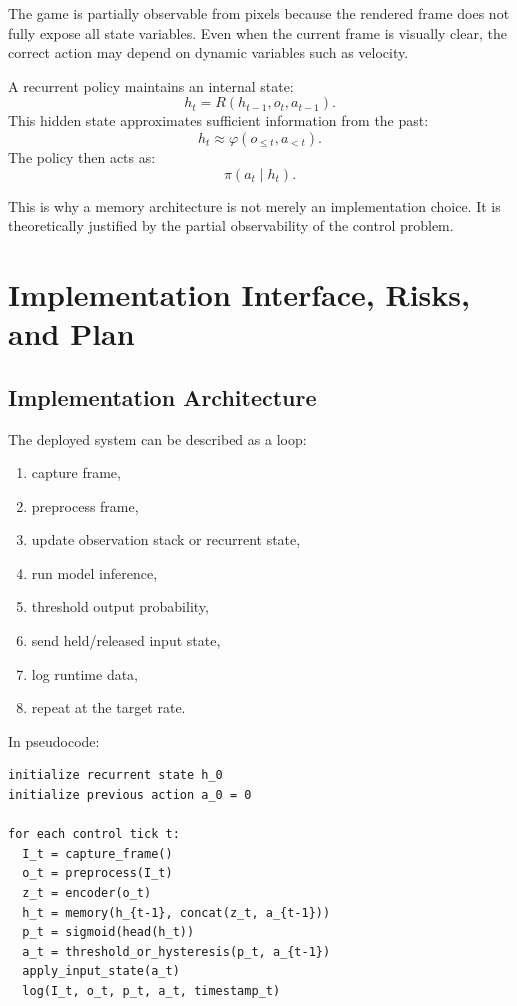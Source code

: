 \documentclass[11pt]{article}
\begin{document}
The game is partially observable from pixels because the rendered frame does not fully expose all state variables. Even when the current frame is visually clear, the correct action may depend on dynamic variables such as velocity.

A recurrent policy maintains an internal state:
\[
  h_t = R(h_{t-1},o_t,a_{t-1}).
\]
This hidden state approximates sufficient information from the past:
\[
  h_t \approx \varphi(o_{\le t},a_{<t}).
\]
The policy then acts as:
\[
  \pi(a_t \mid h_t).
\]

This is why a memory architecture is not merely an implementation choice. It is theoretically justified by the partial observability of the control problem.

\section{Implementation Interface, Risks, and Plan}

\subsection{Implementation Architecture}

The deployed system can be described as a loop:
\begin{enumerate}
  \item capture frame,
  \item preprocess frame,
  \item update observation stack or recurrent state,
  \item run model inference,
  \item threshold output probability,
  \item send held/released input state,
  \item log runtime data,
  \item repeat at the target rate.
\end{enumerate}

In pseudocode:
\begin{verbatim}
initialize recurrent state h_0
initialize previous action a_0 = 0

for each control tick t:
  I_t = capture_frame()
  o_t = preprocess(I_t)
  z_t = encoder(o_t)
  h_t = memory(h_{t-1}, concat(z_t, a_{t-1}))
  p_t = sigmoid(head(h_t))
  a_t = threshold_or_hysteresis(p_t, a_{t-1})
  apply_input_state(a_t)
  log(I_t, o_t, p_t, a_t, timestamp_t)
\end{verbatim}
\end{document}
